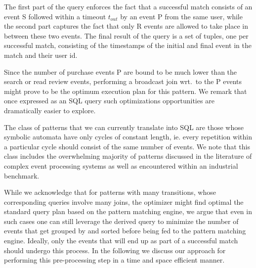 The first part of the query enforces the fact that a successful match consists
of an event S followed within a timeout $t_{out}$ by an event P from the same 
user,
while the second part captures the fact that only R events are allowed to take
place in between these two events.
The final result of the query is a set of tuples, one per successful match,
consisting of the timestamps of the initial and final event
in the match and their user id.

Since the number of purchase events P are bound to be much lower than the
search or read review events, performing a broadcast join wrt.\ to the P events
might prove to be the optimum execution plan for this pattern. We remark that
once expressed as an SQL query such optimizations opportunities are dramatically
easier to explore.



The class of patterns that we can currently translate into SQL are those whose
symbolic automata have only cycles of constant length, ie. every repetition
within a particular cycle should consist of the same number of events. 
We note that this class includes the overwhelming majority of patterns discussed
in the literature of complex event processing systems as well as encountered
within an industrial benchmark.

While we acknowledge that for patterns with many transitions, whose
corresponding queries involve many joins, the optimizer might find optimal the
standard query plan based on the pattern matching engine,
we argue that even in such cases one can still leverage the derived query to
minimize the number of events that get grouped by and sorted before being fed to
the pattern matching engine.
Ideally, only the events that will end up as part of a successful match should
undergo this process.
In the following we discuss our approach for performing this pre-processing step
in a time and space efficient manner.



